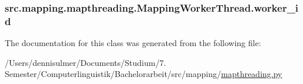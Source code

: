 \subsubsection[{\texorpdfstring{worker\+\_\+id}{worker\_id}}]{\setlength{\rightskip}{0pt plus 5cm}src.\+mapping.\+mapthreading.\+Mapping\+Worker\+Thread.\+worker\+\_\+id}\hypertarget{classsrc_1_1mapping_1_1mapthreading_1_1_mapping_worker_thread_a31a9d651719e7dc0c3c0655885b057f1}{}\label{classsrc_1_1mapping_1_1mapthreading_1_1_mapping_worker_thread_a31a9d651719e7dc0c3c0655885b057f1}


The documentation for this class was generated from the following file\+:\begin{DoxyCompactItemize}
\item 
/\+Users/dennisulmer/\+Documents/\+Studium/7. Semester/\+Computerlinguistik/\+Bachelorarbeit/src/mapping/\hyperlink{mapthreading_8py}{mapthreading.\+py}\end{DoxyCompactItemize}
